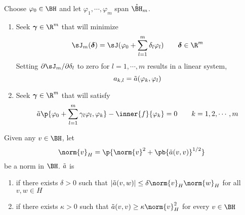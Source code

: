 \documentclass[11pt]{article}
\begin{document}
\begin{definition*}
     Choose $\varphi_0 \in \BH$ and let $\varphi_1,\cdots,\varphi_m$ span $\mathring{\BH}_m$. 
    \begin{enumerate}
        \item {} Seek $\boldsymbol{\gamma} \in \R^m$ that will minimize
        \[
            \sJ_m(\boldsymbol{\delta}) = \sJ(\varphi_0 + \sum_{l=1}^m \delta_l \varphi_l)
            \quad \quad 
            \boldsymbol{\delta} \in \R^m
        \]
        Setting $\partial \sJ_m / \partial \delta_l$ to zero for $l=1,\cdots,m$ results in a linear system,
        \[
            a_{k,l} = \tilde{a}(\varphi_k, \varphi_l)
        \]
        \item {} Seek $\boldsymbol{\gamma} \in \R^m$ that will satisfy
        \[
            \ta\p{
                \varphi_0 + \sum_{l=1}^m \gamma_l \varphi_l, \varphi_k
            } - \inner{f}{\varphi_k} = 0
            \quad \quad k = 1,2,\cdots, m
        \]
    \end{enumerate}
\end{definition*}

\begin{definition*}
     Given any $v\in\BH$, let 
    \[
        \norm{v}_H = \p{
            \norm{v}^2 + \pb{\ta(v,v)}^{1/2}
        }    
    \]
    be a norm in $\BH$. $\tilde{a}$ is 
    \begin{enumerate}
        \item {} if there exists $\delta>0$ such that $\abs{\ta(v,w)} \leq \delta \norm{v}_H \norm{w}_H$ for all $v,w\in H$
        \item {} if there exists $\kappa > 0$ such that $\ta(v,v) \geq \kappa \norm{v}^2_H$ for every $v\in \BH$
    \end{enumerate}
\end{definition*}
\end{document}
